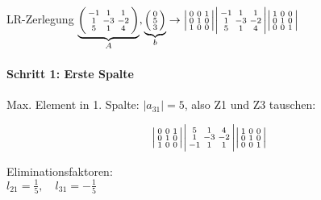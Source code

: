 \begin{example2}{LR-Zerlegung}
$\underbrace{\begin{psmallmatrix}
-1 & 1 & 1\\
1 & -3 & -2\\
5 & 1 & 4
\end{psmallmatrix}}_{A}, \underbrace{\begin{psmallmatrix}
0\\
5\\
3
\end{psmallmatrix}}_{b}
\rightarrow \begin{vsmallmatrix}
0 & 0 & 1\\
0 & 1 & 0\\
1 & 0 & 0
\end{vsmallmatrix} \begin{vsmallmatrix}
-1 & 1 & 1\\
1 & -3 & -2\\
5 & 1 & 4
\end{vsmallmatrix}
\begin{vsmallmatrix}
1 & 0 & 0\\
0 & 1 & 0\\
0 & 0 & 1
\end{vsmallmatrix}$

\paragraph{Schritt 1: Erste Spalte}
Max. Element in 1. Spalte: $|a_{31}| = 5$, also Z1 und Z3 tauschen:

\begin{minipage}{0.5\textwidth}
$$\begin{vsmallmatrix}
0 & 0 & 1\\
0 & 1 & 0\\
1 & 0 & 0
\end{vsmallmatrix} \begin{vsmallmatrix}
5 & 1 & 4\\
1 & -3 & -2\\
-1 & 1 & 1
\end{vsmallmatrix}
\begin{vsmallmatrix}
1 & 0 & 0\\
0 & 1 & 0\\
0 & 0 & 1
\end{vsmallmatrix}$$
\end{minipage}
\begin{minipage}{0.45\textwidth}
    \vspace{2mm}
    Eliminationsfaktoren:\\
    $l_{21} = \frac{1}{5}, \quad l_{31} = -\frac{1}{5}$
\end{minipage}



\end{example2}
